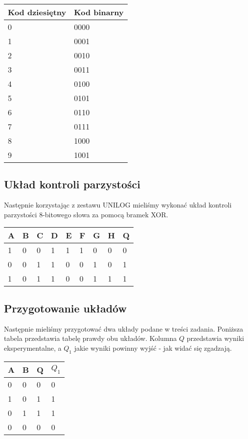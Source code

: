 \documentclass[a4paper,11pt]{article}
\begin{document}
\begin{center}
	\begin{tabular}{|l|l|}\hline
	Kod dziesiętny & Kod binarny \\ \hline
	0 & 0000 \\
	1 & 0001 \\
	2 & 0010 \\
	3 & 0011 \\
	4 & 0100 \\
	5 & 0101 \\
	6 & 0110 \\
	7 & 0111 \\
	8 & 1000 \\
	9 & 1001 \\ \hline
	\end{tabular}
\end{center}

\subsection{Układ kontroli parzystości}

Następnie korzystając z zestawu UNILOG mieliśmy wykonać układ kontroli parzystości 8-bitowego słowa za pomocą bramek XOR. 

\begin{center}
	\begin{tabular}{|l|l|l|l|l|l|l|l||l|}\hline
	A & B & C & D & E & F & G & H & Q \\ \hline
	1 & 0 & 0 & 1 & 1 & 1 & 0 & 0 & 0 \\
	0 & 0 & 1 & 1 & 0 & 0 & 1 & 0 & 1 \\
	1 & 0 & 1 & 1 & 0 & 0 & 1 & 1 & 1 \\ \hline
	\end{tabular}
\end{center}

\subsection{Przygotowanie układów}

Następnie mieliśmy przygotować dwa układy podane w treści zadania. Poniższa tabela przedstawia tabelę prawdy obu układów. Kolumna $Q$ przedstawia wyniki eksperymentalne, a $Q_1$ jakie wyniki powinny wyjść - jak widać się zgadzają.

\begin{center}
	\begin{tabular}{|l|l||l||l|} \hline
	A & B & Q & $Q_1$ \\ \hline
	0 & 0 & 0 & 0   \\
	1 & 0 & 1 & 1   \\
	0 & 1 & 1 & 1   \\
	0 & 0 & 0 & 0   \\ \hline
	\end{tabular}
\end{center}
\end{document}
